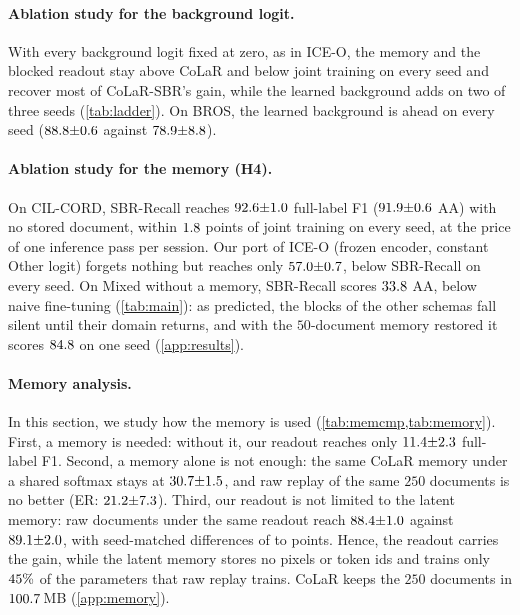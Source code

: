 \documentclass[10pt,twocolumn,letterpaper]{article}
\begin{document}
\paragraph{Ablation study for the background logit.} With every background logit fixed at zero, as in ICE-O, the memory and the blocked readout stay above CoLaR and below joint training on every seed and recover most of CoLaR-SBR's gain, while the learned background adds on two of three seeds (\cref{tab:ladder}). On BROS, the learned background is ahead on every seed ($88.8{\pm}0.6$ against $78.9{\pm}8.8$).

\paragraph{Ablation study for the memory (H4).} On CIL-CORD, SBR-Recall reaches $92.6{\pm}1.0$ full-label F1 ($91.9{\pm}0.6$ AA) with no stored document, within $1.8$ points of joint training on every seed, at the price of one inference pass per session. Our port of ICE-O (frozen encoder, constant Other logit) forgets nothing but reaches only $57.0{\pm}0.7$, below SBR-Recall on every seed. On Mixed without a memory, SBR-Recall scores $33.8$ AA, below naive fine-tuning (\cref{tab:main}): as predicted, the blocks of the other schemas fall silent until their domain returns, and with the $50$-document memory restored it scores $84.8$ on one seed (\cref{app:results}).

\paragraph{Memory analysis.}\label{sec:cost} In this section, we study how the memory is used (\cref{tab:memcmp,tab:memory}). First, a memory is needed: without it, our readout reaches only $11.4{\pm}2.3$ full-label F1. Second, a memory alone is not enough: the same CoLaR memory under a shared softmax stays at $30.7{\pm}1.5$, and raw replay of the same $250$ documents is no better (ER: $21.2{\pm}7.3$). Third, our readout is not limited to the latent memory: raw documents under the same readout reach $88.4{\pm}1.0$ against $89.1{\pm}2.0$, with seed-matched differences of \nErSbrDiffFullMin{} to \nErSbrDiffFullMax{} points. Hence, the readout carries the gain, while the latent memory stores no pixels or token ids and trains only $45\%$ of the parameters that raw replay trains. CoLaR keeps the $250$ documents in $100.7$\,MB (\cref{app:memory}).
\end{document}
